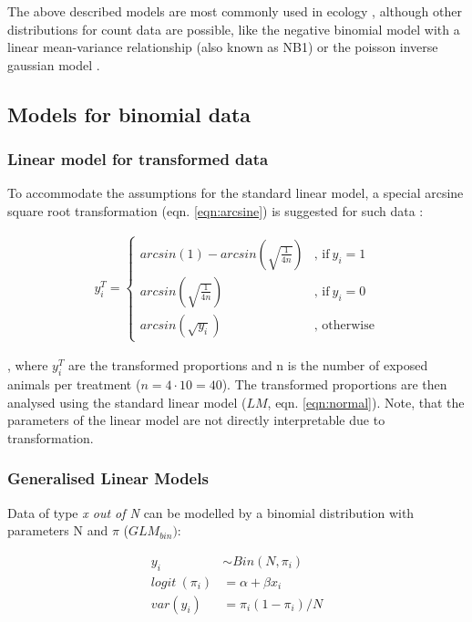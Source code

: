 \documentclass{scrartcl}
\begin{document}
The above described models are most commonly used in ecology \citep{ver_hoef_quasi-poisson_2007}, although other distributions for count data are possible, like the negative binomial model with a linear mean-variance relationship (also known as NB1) or the poisson inverse gaussian model \citep{hilbe_modeling_2014}.


\subsection{Models for binomial data}
\subsubsection{Linear model for transformed data}
To accommodate the assumptions for the standard linear model, a special arcsine square root transformation (eqn. \ref{eqn:arcsine}) is suggested for such  data \citep{epa_methods_2002,newman_quantitative_2012}:

\begin{align}
  y_i^T = 
  \begin{cases}  
    arcsin(1) - arcsin(\sqrt{\frac{1}{4n}}) & \text{, if}\ y_i = 1 \\
    arcsin(\sqrt{\frac{1}{4n}}) & \text{, if}\ y_i = 0  \\
    arcsin(\sqrt{y_i}) & \text{, otherwise}
  \end{cases} \label{eqn:arcsine}
\end{align}

, where $y_i^T$ are the transformed proportions and n is the number of exposed animals per treatment ($n = 4 \cdot 10=40$).
The transformed proportions are then analysed using the standard linear model ($LM$, eqn. \ref{eqn:normal}).
Note, that the parameters of the linear model are not directly interpretable due to transformation.


\subsubsection{Generalised Linear Models}
Data of type \emph{x out of N} can be modelled by a binomial distribution with parameters N and $\pi$ ($GLM_{bin})$:

\begin{align}
  y_i &\sim Bin(N, \pi_i) \nonumber \\
  logit~(\pi_i) &= \alpha + \beta x_i \label{eqn:bin} \\
  var(y_i) &=  \pi_i (1 - \pi_i) / N \nonumber
\end{align}
\end{document}
